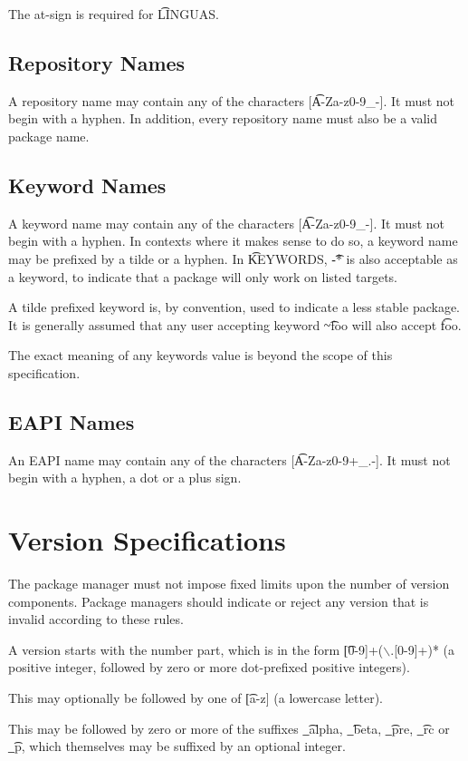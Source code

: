 \note The at-sign is required for \t{LINGUAS}.

\subsection{Repository Names}
\label{sec:repository-names}
A repository name may contain any of the characters [\t{A-Za-z0-9\_-}]. It must not begin with a
hyphen. In addition, every repository name must also be a valid package name.

\subsection{Keyword Names}
\label{sec:keyword-names}
A keyword name may contain any of the characters [\t{A-Za-z0-9\_-}]. It must not begin with a
hyphen. In contexts where it makes sense to do so, a keyword name may be prefixed by
a tilde or a hyphen. In \t{KEYWORDS}, \t{-*} is also acceptable as a keyword, to indicate that
a package will only work on listed targets.

A tilde prefixed keyword is, by convention, used to indicate a less stable package. It is generally
assumed that any user accepting keyword \t{\textasciitilde{}foo} will also accept \t{foo}.

The exact meaning of any keywords value is beyond the scope of this specification.

\subsection{EAPI Names}
\label{sec:eapi-names}
An EAPI name may contain any of the characters [\t{A-Za-z0-9+\_.-}]. It must not begin with a
hyphen, a dot or a plus sign.

\section{Version Specifications}
The package manager must not impose fixed limits upon the number of version components. Package
managers should indicate or reject any version that is invalid according to these rules.

A version starts with the number part, which is in the form \t{[0-9]+($\backslash$.[0-9]+)*} (a positive
integer, followed by zero or more dot-prefixed positive integers).

This may optionally be followed by one of \t{[a-z]} (a lowercase letter).

This may be followed by zero or more of the suffixes \t{\_alpha}, \t{\_beta}, \t{\_pre},
\t{\_rc} or \t{\_p}, which themselves may be suffixed by an optional integer.

